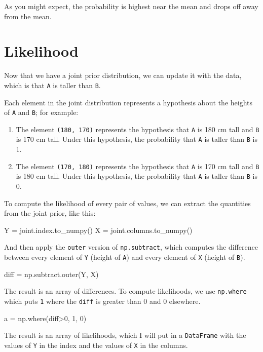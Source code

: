 \documentclass[12pt]{book}
\theoremstyle{exercise}
\newcommand{\py}[1]{{\tt #1}}%
\begin{document}
As you might expect, the probability is highest near the mean and drops off away from the mean.


\section{Likelihood}

Now that we have a joint prior distribution, we can update it with the data, which is that \py{A} is taller than \py{B}.

Each element in the joint distribution represents a hypothesis about the heights of \py{A} and \py{B}; for example:

\begin{enumerate}

\item The element \py{(180, 170)} represents the hypothesis that \py{A} is 180 cm tall and \py{B} is 170 cm tall.  Under this hypothesis, the probability that \py{A} is taller than \py{B} is 1.

\item The element \py{(170, 180)} represents the hypothesis that \py{A} is 170 cm tall and \py{B} is 180 cm tall.  Under this hypothesis, the probability that \py{A} is taller than \py{B} is 0.

\end{enumerate}

To compute the likelihood of every pair of values, we can extract the quantities from the joint prior, like this:

\begin{code}
Y = joint.index.to_numpy()
X = joint.columns.to_numpy()
\end{code}

And then apply the \py{outer} version of \py{np.subtract}, which computes the difference between every element of \py{Y} (height of \py{A}) and every element of \py{X} (height of \py{B}).

\begin{code}
diff = np.subtract.outer(Y, X)
\end{code}

The result is an array of differences.  To compute likelihoods, we use \py{np.where} which puts \py{1} where the \py{diff} is greater than 0 and 0 elsewhere.

\begin{code}
a = np.where(diff>0, 1, 0)
\end{code}

The result is an array of likelihoods, which I will put in a \py{DataFrame} with the values of \py{Y} in the index and the values of \py{X} in the columns.
\end{document}
